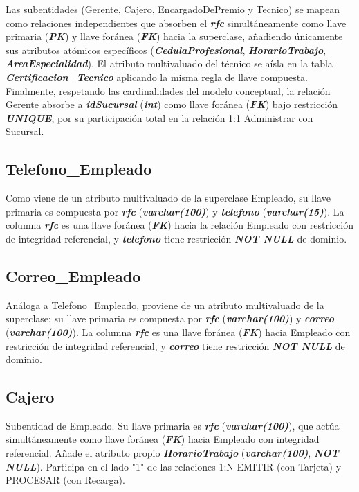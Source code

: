 \documentclass[11pt,letterpaper,spanish]{article}
\begin{document}
Las subentidades (Gerente, Cajero, EncargadoDePremio y Tecnico) se mapean como relaciones independientes que absorben el \textbf{\textit{rfc}} simultáneamente como llave primaria (\textbf{\textit{PK}}) y llave foránea (\textbf{\textit{FK}}) hacia la superclase, añadiendo únicamente sus atributos atómicos específicos (\textbf{\textit{CedulaProfesional}}, \textbf{\textit{HorarioTrabajo}}, \textbf{\textit{AreaEspecialidad}}). El atributo multivaluado del técnico se aísla en la tabla \textbf{\textit{Certificacion\_Tecnico}} aplicando la misma regla de llave compuesta. Finalmente, respetando las cardinalidades del modelo conceptual, la relación Gerente absorbe a \textbf{\textit{idSucursal}} (\textbf{\textit{int}}) como llave foránea (\textbf{\textit{FK}}) bajo restricción \textbf{\textit{UNIQUE}}, por su participación total en la relación 1:1 Administrar con Sucursal.

\subsection{Telefono\_Empleado}
Como viene de un atributo multivaluado de la superclase Empleado, su llave primaria es compuesta por \textbf{\textit{rfc}} (\textbf{\textit{varchar(100)}}) y \textbf{\textit{telefono}} (\textbf{\textit{varchar(15)}}). La columna \textbf{\textit{rfc}} es una llave foránea (\textbf{\textit{FK}}) hacia la relación Empleado con restricción de integridad referencial, y \textbf{\textit{telefono}} tiene restricción \textbf{\textit{NOT NULL}} de dominio.

\subsection{Correo\_Empleado}
Análoga a Telefono\_Empleado, proviene de un atributo multivaluado de la superclase; su llave primaria es compuesta por \textbf{\textit{rfc}} (\textbf{\textit{varchar(100)}}) y \textbf{\textit{correo}} (\textbf{\textit{varchar(100)}}). La columna \textbf{\textit{rfc}} es una llave foránea (\textbf{\textit{FK}}) hacia Empleado con restricción de integridad referencial, y \textbf{\textit{correo}} tiene restricción \textbf{\textit{NOT NULL}} de dominio.

\subsection{Cajero}
Subentidad de Empleado. Su llave primaria es \textbf{\textit{rfc}} (\textbf{\textit{varchar(100)}}), que actúa simultáneamente como llave foránea (\textbf{\textit{FK}}) hacia Empleado con integridad referencial. Añade el atributo propio \textbf{\textit{HorarioTrabajo}} (\textbf{\textit{varchar(100)}}, \textbf{\textit{NOT NULL}}). Participa en el lado "1" de las relaciones 1:N EMITIR (con Tarjeta) y PROCESAR (con Recarga).
\end{document}
